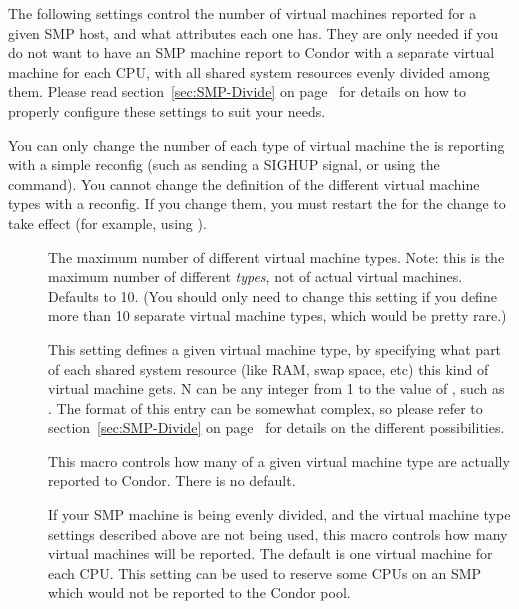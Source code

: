 \begin{description}
\end{description}

The following settings control the number of virtual machines reported
for a given SMP host, and what attributes each one has.  
They are only needed if you do not want to have an SMP machine report
to Condor with a separate virtual machine for each CPU, with all
shared system resources evenly divided among them.
Please read section~\ref{sec:SMP-Divide} on
page~\pageref{sec:SMP-Divide} for details on how to properly configure
these settings to suit your needs.

\Note You can only change the number of each type of virtual machine
the  is reporting with a simple reconfig (such as
sending a SIGHUP signal, or using the  command).
You cannot change the definition of the different virtual machine
types with a reconfig.  
If you change them, you must restart the  for the
change to take effect (for example, using 
).

\begin{description}

\item[]
\label{param:MaxVirtualMachineTypes}
  The maximum number of different virtual machine types.  
  Note: this is the maximum number of different \emph{types}, not of
  actual virtual machines.
  Defaults to 10.  
  (You should only need to change this setting if you define more than
  10 separate virtual machine types, which would be pretty rare.)

\item[]
\label{param:VirtualMachineTypeN}
  This setting defines a given virtual machine type, by specifying
  what part of each shared system resource (like RAM, swap space, etc)
  this kind of virtual machine gets.
  N can be any integer from 1 to the value of
  , such as
  . 
  The format of this entry can be somewhat complex, so please refer to
  section~\ref{sec:SMP-Divide} on page~\pageref{sec:SMP-Divide} for
  details on the different possibilities.

\item[]
\label{param:NumVirtualMachinesTypeN}
  This macro controls how many of a given virtual machine type
  are actually reported to Condor.
  There is no default.

\item[]
\label{param:NumVirtualMachines}
  If your SMP machine is being evenly divided, and the virtual
  machine type settings described above are not being used, this
  macro controls how many virtual machines will be reported.  
  The default is one virtual machine for each CPU.
  This setting can be used to reserve some CPUs on an SMP which would
  not be reported to the Condor pool.

\end{description}


